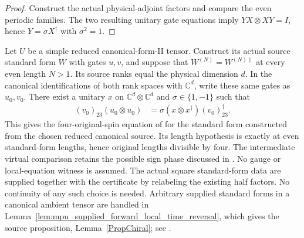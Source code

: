 \begin{proof}\leanok
    Construct the actual physical-adjoint factors and compare the even
    periodic families. The two resulting unitary gate equations imply
    $YX\otimes XY=I$, hence $Y=\sigma X^\dagger$ with $\sigma^2=1$.
\end{proof}

\begin{lemma}
    \label{lem:mpu_canonical_forward_local_time_reversal}
    \leanok
    Let $U$ be a simple reduced canonical-form-II tensor. Construct its actual
    source standard form $W$ with gates $u,v$, and suppose that
    $W^{(N)}=W^{(N)\dagger}$ at every even length $N>1$. Its source
    ranks equal the physical dimension $d$. In the canonical identifications
    of both rank spaces with $\mathbb C^d$, write these same gates as $u_0,v_0$.
    There exist a unitary $x$ on $\mathbb C^d\otimes\mathbb C^d$ and
    $\sigma\in\{1,-1\}$ such that
    \begin{align}
        (v_0)_{23}(u_0\otimes u_0)
         & =\sigma(x\otimes x^\dagger)(v_0)_{23}^\dagger.
    \end{align}
    This gives the four-original-spin equation of
    \cite[lines~1237--1252]{Cirac2017MPU} for the standard form constructed
    from the chosen reduced canonical source. Its length hypothesis is exactly
    at even standard-form lengths, hence original lengths divisible by four.
    The intermediate virtual comparison retains the possible sign phase
    discussed in \cite{gap:mpu_standard_form_parity_gap}. No gauge or local-equation
    witness is assumed. The actual square standard-form data are supplied
    together with the certificate by relabeling the existing half factors.
    No continuity of any such choice is needed. Arbitrary supplied standard
    forms in a canonical ambient tensor are handled in
    Lemma~\ref{lem:mpu_supplied_forward_local_time_reversal}, which gives the
    source proposition, Lemma~\ref{PropChiral}; see
    \cite{gap:mpu_standard_form_canonical_convention}.
\end{lemma}

